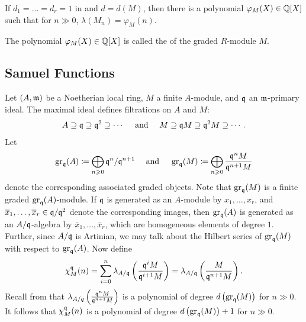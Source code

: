\begin{corollary}
    If $d_1 = \dots = d_r = 1$ in  and $d = d(M)$, then there is a polynomial $\varphi_M(X)\in\mathbb{Q}[X]$ such that for $n\gg 0$, $\lambda(M_n) = \varphi_M(n)$.
\end{corollary}

\begin{definition}
    The polynomial $\varphi_M(X)\in\mathbb{Q}[X]$ is called the  of the graded $R$-module $M$. 
\end{definition}

\subsection{Samuel Functions}

Let $(A,\mathfrak{m})$ be a Noetherian local ring, $M$ a finite $A$-module, and $\mathfrak{q}$ an $\mathfrak{m}$-primary ideal. The maximal ideal defines filtrations on $A$ and $M$: 
\begin{equation*}
    A\supseteq\mathfrak{q}\supseteq\mathfrak{q}^2\supseteq\cdots\quad\text{ and }\quad M\supseteq\mathfrak{q} M\supseteq\mathfrak{q}^2 M\supseteq\cdots.
\end{equation*}
Let 
\begin{equation*}
    \operatorname{gr}_{\mathfrak{q}}(A) \coloneq \bigoplus_{n\geqslant 0}\mathfrak{q}^n/\mathfrak{q}^{n + 1}\quad\text{ and }\quad\operatorname{gr}_{\mathfrak{q}}(M)\coloneq\bigoplus_{n\geqslant 0}\frac{\mathfrak{q}^nM}{\mathfrak{q}^{n + 1}M}
\end{equation*}
denote the corresponding associated graded objects. Note that $\operatorname{gr}_{\mathfrak{q}}(M)$ is a finite graded $\operatorname{gr}_{\mathfrak{q}}(A)$-module. If $\mathfrak{q}$ is generated as an $A$-module by $x_1,\dots,x_r$, and $\overline x_1,\dots,\overline x_r\in\mathfrak{q}/\mathfrak{q}^2$ denote the corresponding images, then $\operatorname{gr}_{\mathfrak{q}}(A)$ is generated as an $A/\mathfrak{q}$-algebra by $\overline x_1,\dots,\overline x_r$, which are homogeneous elements of degree $1$. Further, since $A/\mathfrak{q}$ is Artinian, we may talk about the Hilbert series of $\operatorname{gr}_{\mathfrak{q}}(M)$ with respect to $\operatorname{gr}_{\mathfrak{q}}(A)$. Now define 
\begin{equation*}
    \chi_M^{\mathfrak{q}}(n) = \sum_{i = 0}^n \lambda_{A/\mathfrak{q}}\left(\frac{\mathfrak{q}^i M}{\mathfrak{q}^{i + 1} M}\right) = \lambda_{A/\mathfrak{q}}\left(\frac{M}{\mathfrak{q}^{n + 1}M}\right).
\end{equation*}
Recall from  that $\lambda_{A/q}\left(\frac{\mathfrak{q}^n M}{\mathfrak{q}^{n + 1}M}\right)$ is a polynomial of degree $d\left(\operatorname{gr}_{\mathfrak{q}}(M)\right)$ for $n\gg 0$. It follows that $\chi_M^{\mathfrak{q}}(n)$ is a polynomial of degree $d\left(\operatorname{gr}_{\mathfrak{q}}(M)\right) + 1$ for $n\gg 0$.

